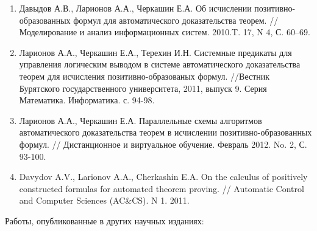 \documentclass[a4paper]{report}
\begin{document}
\begin{enumerate}
\item Давыдов А.В., Ларионов А.А., Черкашин Е.А. Об исчислении
позитивно-образованных формул для автоматического доказательства
теорем. // Моделирование и анализ информационных систем. 2010.T. 17, N
4, С. 60--69.
\item Ларионов А.А., Черкашин Е.А., Терехин И.Н. Системные предикаты для
управления логическим выводом в системе автоматического доказательства
теорем для исчисления позитивно-образованых формул. //Вестник
Бурятского государственного университета, 2011, выпуск 9. Серия
Математика. Информатика. с. 94-98.
\item Ларионов А.А., Черкашин Е.А. Параллельные схемы алгоритмов
автоматического доказательства теорем в исчислении
позитивно-образованных формул. // Дистанционное и виртуальное
обучение. Февраль 2012. No. 2, С. 93-100.
\item Davydov A.V., Larionov A.A., Cherkashin E.A. On the calculus of
positively constructed formulas for automated theorem proving. //
Automatic Control and Computer Sciences (AC\&CS). N 1. 2011.
\end{enumerate} 

Работы, опубликованные в других научных изданиях:
\end{document}
